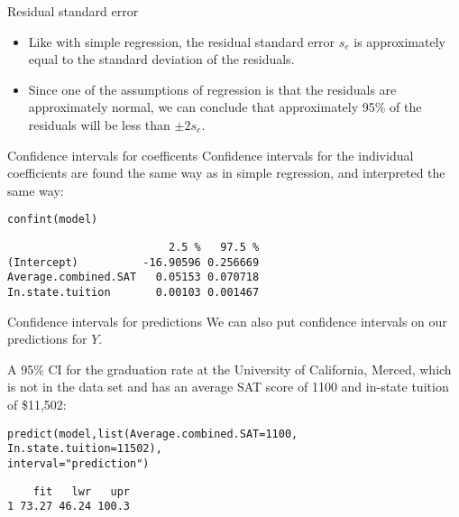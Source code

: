 \documentclass{beamer}\usepackage[]{graphicx}\usepackage[]{color}
\makeatletter
\newcommand{\hlnum}[1]{\textcolor[rgb]{0.824,0.412,0.118}{#1}}%
\newcommand{\hlstr}[1]{\textcolor[rgb]{1,0.894,0.71}{#1}}%
\newcommand{\hlstd}[1]{\textcolor[rgb]{1,0.894,0.769}{#1}}%
\newcommand{\hlkwc}[1]{\textcolor[rgb]{0.78,0.941,0.545}{#1}}%
\newcommand{\hlkwd}[1]{\textcolor[rgb]{1,0.78,0.769}{#1}}%
\newenvironment{kframe}{%
 \def\at@end@of@kframe{}%
 \ifinner\ifhmode%
  \def\at@end@of@kframe{\end{minipage}}%
  \begin{minipage}{\columnwidth}%
 \fi\fi%
 \def\FrameCommand##1{\hskip\@totalleftmargin \hskip-\fboxsep
 \colorbox{shadecolor}{##1}\hskip-\fboxsep
     \hskip-\linewidth \hskip-\@totalleftmargin \hskip\columnwidth}%
 \MakeFramed {\advance\hsize-\width
   \@totalleftmargin\z@ \linewidth\hsize
   \@setminipage}}%
 {\par\unskip\endMakeFramed%
 \at@end@of@kframe}
\newenvironment{knitrout}{}{} %
\makeatother
\begin{document}
\begin{darkframes}
    \begin{frame}{Residual standard error}
      \begin{itemize}[<+->]
        \item Like with simple regression, the \alert{residual standard error} $s_e$ is approximately equal to the standard deviation of the residuals.
        \item Since one of the assumptions of regression is that the residuals are approximately normal, we can conclude that approximately 95\% of the residuals will be less than $\pm 2s_e$.
      \end{itemize}
    \end{frame}

    \begin{frame}[fragile]{Confidence intervals for coefficents}
      Confidence intervals for the individual coefficients are found the same way as in simple regression, and interpreted the same way:
\begin{knitrout}
\color{fgcolor}\begin{kframe}
\begin{alltt}
\hlkwd{confint}\hlstd{(model)}
\end{alltt}
\begin{verbatim}
                         2.5 %   97.5 %
(Intercept)          -16.90596 0.256669
Average.combined.SAT   0.05153 0.070718
In.state.tuition       0.00103 0.001467
\end{verbatim}
\end{kframe}
\end{knitrout}
    \end{frame}

    \begin{frame}[fragile]{Confidence intervals for predictions}
      \fontsm
      We can also put confidence intervals on our predictions for $Y$.

      \bigskip\pause

      A 95\% CI for the graduation rate at the University of California, Merced, which is not in the data set and has an average SAT score of 1100 and in-state tuition of \$11,502:
\begin{knitrout}
\color{fgcolor}\begin{kframe}
\begin{alltt}
\hlkwd{predict}\hlstd{(model,} \hlkwd{list}\hlstd{(}\hlkwc{Average.combined.SAT}\hlstd{=}\hlnum{1100}\hlstd{,}
                    \hlkwc{In.state.tuition}\hlstd{=}\hlnum{11502}\hlstd{),}
               \hlkwc{interval}\hlstd{=}\hlstr{"prediction"}\hlstd{)}
\end{alltt}
\begin{verbatim}
    fit   lwr   upr
1 73.27 46.24 100.3
\end{verbatim}
\end{kframe}
\end{knitrout}
      


\end{frame}
\end{darkframes}
\end{document}
